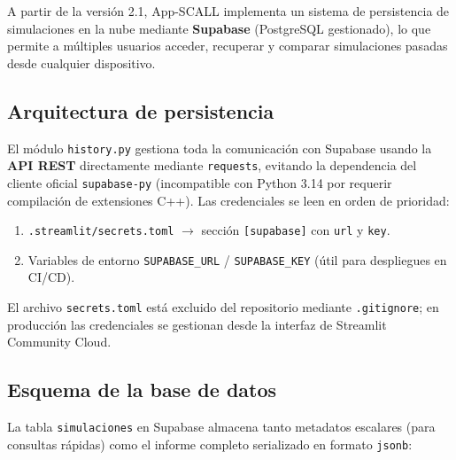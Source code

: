 \documentclass[12pt, a4paper]{article}
\begin{document}
A partir de la versión 2.1, App-SCALL implementa un sistema de persistencia de simulaciones en la nube mediante \textbf{Supabase} (PostgreSQL gestionado), lo que permite a múltiples usuarios acceder, recuperar y comparar simulaciones pasadas desde cualquier dispositivo.

\subsection{Arquitectura de persistencia}

El módulo \texttt{history.py} gestiona toda la comunicación con Supabase usando la \textbf{API REST} directamente mediante \texttt{requests}, evitando la dependencia del cliente oficial \texttt{supabase-py} (incompatible con Python 3.14 por requerir compilación de extensiones C++). Las credenciales se leen en orden de prioridad:

\begin{enumerate}
    \item \texttt{.streamlit/secrets.toml} $\rightarrow$ sección \texttt{[supabase]} con \texttt{url} y \texttt{key}.
    \item Variables de entorno \texttt{SUPABASE\_URL} / \texttt{SUPABASE\_KEY} (útil para despliegues en CI/CD).
\end{enumerate}

El archivo \texttt{secrets.toml} está excluido del repositorio mediante \texttt{.gitignore}; en producción las credenciales se gestionan desde la interfaz de Streamlit Community Cloud.

\subsection{Esquema de la base de datos}

La tabla \texttt{simulaciones} en Supabase almacena tanto metadatos escalares (para consultas rápidas) como el informe completo serializado en formato \texttt{jsonb}:
\end{document}
